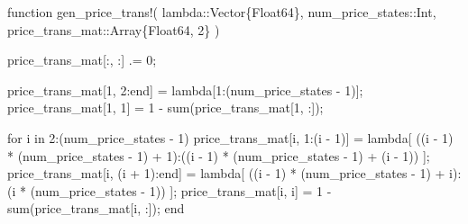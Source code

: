 \documentclass[
  letterpaper,
  DIV=11,
  numbers=noendperiod]{scrreprt}
\newenvironment{Shaded}{\begin{snugshade}}{\end{snugshade}}
\newcommand{\ControlFlowTok}[1]{\textcolor[rgb]{0.00,0.23,0.31}{#1}}
\newcommand{\DataTypeTok}[1]{\textcolor[rgb]{0.68,0.00,0.00}{#1}}
\newcommand{\FloatTok}[1]{\textcolor[rgb]{0.68,0.00,0.00}{#1}}
\newcommand{\FunctionTok}[1]{\textcolor[rgb]{0.28,0.35,0.67}{#1}}
\newcommand{\KeywordTok}[1]{\textcolor[rgb]{0.00,0.23,0.31}{#1}}
\newcommand{\NormalTok}[1]{\textcolor[rgb]{0.00,0.23,0.31}{#1}}
\newcommand{\OperatorTok}[1]{\textcolor[rgb]{0.37,0.37,0.37}{#1}}
\begin{document}
\begin{Shaded}
\begin{Highlighting}[]
\KeywordTok{function} \FunctionTok{gen\_price\_trans!}\NormalTok{(}
\NormalTok{    lambda}\OperatorTok{::}\DataTypeTok{Vector\{Float64\}}\NormalTok{,}
\NormalTok{    num\_price\_states}\OperatorTok{::}\DataTypeTok{Int}\NormalTok{,}
\NormalTok{    price\_trans\_mat}\OperatorTok{::}\DataTypeTok{Array\{Float64, 2\}}
\NormalTok{    )}

\NormalTok{    price\_trans\_mat[}\OperatorTok{:}\NormalTok{, }\OperatorTok{:}\NormalTok{] }\OperatorTok{.=} \FloatTok{0}\NormalTok{;}

\NormalTok{    price\_trans\_mat[}\FloatTok{1}\NormalTok{, }\FloatTok{2}\OperatorTok{:}\KeywordTok{end}\NormalTok{] }\OperatorTok{=}\NormalTok{ lambda[}\FloatTok{1}\OperatorTok{:}\NormalTok{(num\_price\_states }\OperatorTok{{-}} \FloatTok{1}\NormalTok{)];}
\NormalTok{    price\_trans\_mat[}\FloatTok{1}\NormalTok{, }\FloatTok{1}\NormalTok{] }\OperatorTok{=} \FloatTok{1} \OperatorTok{{-}} \FunctionTok{sum}\NormalTok{(price\_trans\_mat[}\FloatTok{1}\NormalTok{, }\OperatorTok{:}\NormalTok{]);}

    \ControlFlowTok{for}\NormalTok{ i }\KeywordTok{in} \FloatTok{2}\OperatorTok{:}\NormalTok{(num\_price\_states }\OperatorTok{{-}} \FloatTok{1}\NormalTok{)}
\NormalTok{        price\_trans\_mat[i, }\FloatTok{1}\OperatorTok{:}\NormalTok{(i }\OperatorTok{{-}} \FloatTok{1}\NormalTok{)] }\OperatorTok{=}\NormalTok{ lambda[}
\NormalTok{            ((i }\OperatorTok{{-}} \FloatTok{1}\NormalTok{) }\OperatorTok{*}\NormalTok{ (num\_price\_states }\OperatorTok{{-}} \FloatTok{1}\NormalTok{) }\OperatorTok{+} \FloatTok{1}\NormalTok{)}\OperatorTok{:}\NormalTok{((i }\OperatorTok{{-}} \FloatTok{1}\NormalTok{) }\OperatorTok{*}\NormalTok{ (num\_price\_states }\OperatorTok{{-}} \FloatTok{1}\NormalTok{) }\OperatorTok{+}\NormalTok{ (i }\OperatorTok{{-}} \FloatTok{1}\NormalTok{))}
\NormalTok{            ];}
\NormalTok{        price\_trans\_mat[i, (i }\OperatorTok{+} \FloatTok{1}\NormalTok{)}\OperatorTok{:}\KeywordTok{end}\NormalTok{] }\OperatorTok{=}\NormalTok{ lambda[}
\NormalTok{            ((i }\OperatorTok{{-}} \FloatTok{1}\NormalTok{) }\OperatorTok{*}\NormalTok{ (num\_price\_states }\OperatorTok{{-}} \FloatTok{1}\NormalTok{) }\OperatorTok{+}\NormalTok{ i)}\OperatorTok{:}\NormalTok{(i }\OperatorTok{*}\NormalTok{ (num\_price\_states }\OperatorTok{{-}} \FloatTok{1}\NormalTok{))}
\NormalTok{            ];}
\NormalTok{        price\_trans\_mat[i, i] }\OperatorTok{=} \FloatTok{1} \OperatorTok{{-}} \FunctionTok{sum}\NormalTok{(price\_trans\_mat[i, }\OperatorTok{:}\NormalTok{]);}
    \ControlFlowTok{end}


\end{Highlighting}
\end{Shaded}
\end{document}
